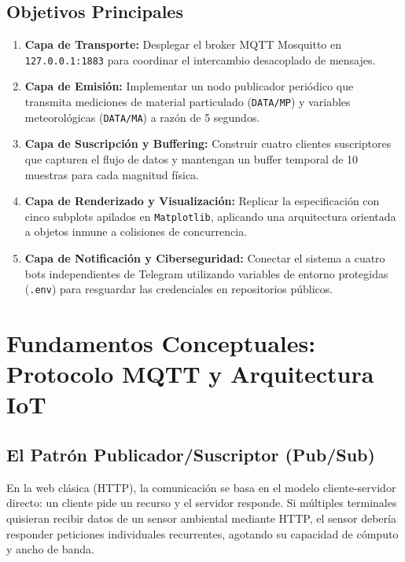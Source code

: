 \documentclass[12pt,letterpaper]{article}
\begin{document}
\subsection{Objetivos Principales}
\begin{enumerate}
    \item \textbf{Capa de Transporte:} Desplegar el broker MQTT Mosquitto en \texttt{127.0.0.1:1883} para coordinar el intercambio desacoplado de mensajes.
    \item \textbf{Capa de Emisión:} Implementar un nodo publicador periódico que transmita mediciones de material particulado (\texttt{DATA/MP}) y variables meteorológicas (\texttt{DATA/MA}) a razón de 5 segundos.
    \item \textbf{Capa de Suscripción y Buffering:} Construir cuatro clientes suscriptores que capturen el flujo de datos y mantengan un buffer temporal de 10 muestras para cada magnitud física.
    \item \textbf{Capa de Renderizado y Visualización:} Replicar la especificación con cinco subplots apilados en \texttt{Matplotlib}, aplicando una arquitectura orientada a objetos inmune a colisiones de concurrencia.
    \item \textbf{Capa de Notificación y Ciberseguridad:} Conectar el sistema a cuatro bots independientes de Telegram utilizando variables de entorno protegidas (\texttt{.env}) para resguardar las credenciales en repositorios públicos.
\end{enumerate}

\section{Fundamentos Conceptuales: Protocolo MQTT y Arquitectura IoT}

\subsection{El Patrón Publicador/Suscriptor (Pub/Sub)}
En la web clásica (HTTP), la comunicación se basa en el modelo cliente-servidor directo: un cliente pide un recurso y el servidor responde. Si múltiples terminales quisieran recibir datos de un sensor ambiental mediante HTTP, el sensor debería responder peticiones individuales recurrentes, agotando su capacidad de cómputo y ancho de banda.
\end{document}
